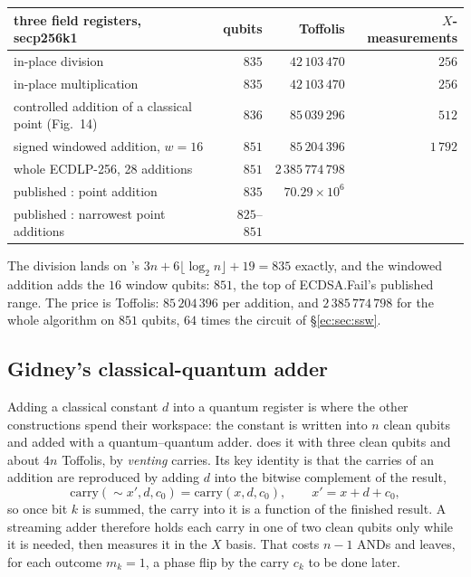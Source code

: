 \documentclass[11pt]{article}
\theoremstyle{plain}
\theoremstyle{remark}
\begin{document}
\begin{center}\small
\begin{tabular}{lrrr}
\toprule
three field registers, secp256k1 & qubits & Toffolis & $X$-measurements\\
\midrule
in-place division & $835$ & $42\,103\,470$ & $256$\\
in-place multiplication & $835$ & $42\,103\,470$ & $256$\\
controlled addition of a classical point (Fig.~14) & $836$ & $85\,039\,296$ & $512$\\
signed windowed addition, $w=16$ & $851$ & $85\,204\,396$ & $1\,792$\\
whole ECDLP-256, 28 additions & $851$ & $2\,385\,774\,798$ & \\
\midrule
published \cite{ec:luo26}: point addition & $835$ & $70.29\times10^6$ & \\
published \cite{ec:ecdsafail26}: narrowest point additions & $825$--$851$ & & \\
\bottomrule
\end{tabular}
\end{center}

\noindent The division lands on \cite{ec:luo26}'s $3n+6\lfloor\log_2n\rfloor+19=835$
exactly, and the windowed addition adds the $16$ window qubits: $851$, the top of
ECDSA.Fail's published range. The price is Toffolis: $85\,204\,396$ per addition, and $2\,385\,774\,798$
for the whole algorithm on $851$ qubits, $64$ times the circuit of
\S\ref{ec:sec:ssw}.

\subsection{Gidney's classical-quantum adder}\label{ec:sec:cqadd}

Adding a classical constant $d$ into a quantum register is where the other constructions spend their
workspace: the constant is written into $n$ clean qubits and added with a quantum--quantum adder.
\cite{ec:gidney25} does it with three clean qubits and about $4n$ Toffolis, by \emph{venting}
carries. Its key identity is that the carries of an addition are reproduced by adding $d$ into the
bitwise complement of the result,
$$\mathrm{carry}(\sim\! x', d, c_0)=\mathrm{carry}(x, d, c_0),\qquad x'=x+d+c_0,$$
so once bit $k$ is summed, the carry into it is a function of the finished result. A streaming adder
therefore holds each carry in one of two clean qubits only while it is needed, then measures it in
the $X$ basis. That costs $n-1$ ANDs and leaves, for each outcome $m_k=1$, a phase flip by the carry
$c_k$ to be done later.
\end{document}
